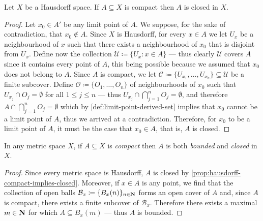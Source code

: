 
\begin{proposition}
\label{prop:hausdorff-compact-implies-closed}
Let \(X\) be a Hausdorff space. If \(A \subseteq X\) is compact then \(A\) is
closed in \(X\).
\end{proposition}

\begin{proof}
Let \(x_0 \in A'\) be any limit point of \(A\). We suppose, for the sake of
contradiction, that \(x_0 \notin A\). Since \(X\) is Hausdorff, for every \(x
\in A\) we let \(U_x\) be a neighbourhood of \(x\) such that there exists a
neighbourhood of \(x_0\) that is disjoint from \(U_x\). Define now the
collection \(\mathcal{U} \coloneq \{U_x : x \in A\}\) --- thus clearly
\(\mathcal{U}\) covers \(A\) since it contains every point of \(A\), this being
possible because we assumed that \(x_0\) does not belong to \(A\). Since \(A\)
is compact, we let \(\mathcal{C} \coloneq \{U_{x_1}, \dots, U_{x_n}\} \subseteq
\mathcal{U}\) be a finite subcover. Define \(\mathcal{O} \coloneq \{O_1, \dots,
O_n\}\) of neighbourhoods of \(x_0\) such that \(U_{x_j} \cap O_j = \emptyset\)
for all \(1 \leq j \leq n\) --- thus \(U_{x_j} \cap \bigcap_{j=1}^n O_j =
\emptyset\), and therefore \(A \cap \bigcap_{j=1}^n O_j = \emptyset\) which by
\cref{def:limit-point-derived-set} implies that \(x_0\) cannot be a limit point
of \(A\), thus we arrived at a contradiction. Therefore, for \(x_0\) to be a
limit point of \(A\), it must be the case that \(x_0 \in A\), that is, \(A\) is
closed.
\end{proof}

\begin{corollary}
\label{cor:metric-space-compact-implies-bounded-closed}
In any metric space \(X\), if \(A \subseteq X\) is \emph{compact} then \(A\) is
both \emph{bounded} and \emph{closed} in \(X\).
\end{corollary}

\begin{proof}
Since every metric space is Hausdorff, \(A\) is closed by
\cref{prop:hausdorff-compact-implies-closed}. Moreover, if \(x \in A\) is any
point, we find that the collection of open balls \(\mathcal{B}_x \coloneq
\{B_x(n)\}_{n \in \mathbf{N}}\) forms an open cover of \(A\) and, since \(A\) is
compact, there exists a finite subcover of \(\mathcal{B}_x\). Therefore there
exists a maximal \(m \in \mathbf{N}\) for which \(A \subseteq B_x(m)\) --- thus \(A\) is
bounded.
\end{proof}

